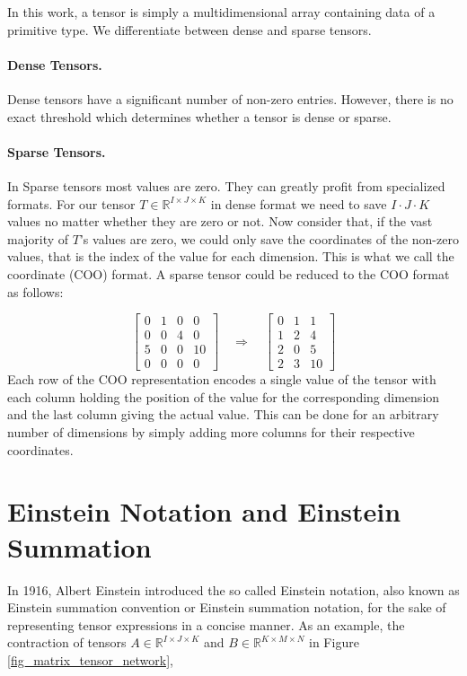 \noindent
In this work, a tensor is simply a multidimensional array containing data of a
primitive type. We differentiate between dense and sparse tensors.

\paragraph{Dense Tensors.}
Dense tensors have a significant number of non-zero entries. However, there is no
exact threshold which determines whether a tensor is dense or sparse.

\paragraph{Sparse Tensors.}
In Sparse tensors most values are zero. They can greatly profit from specialized
formats. For our tensor $T \in \mathbb{R}^{I \times J \times K}$ in dense format
we need to save $I \cdot J \cdot K$ values no matter whether they are zero or not.
Now consider that, if the vast majority of $T$'s values are zero, we could only save
the coordinates of the non-zero values, that is the index of the value for each
dimension. This is what we call the coordinate (COO) format. A sparse tensor could
be reduced to the COO format as follows:

\begin{equation*}
    \begin{bmatrix}
        0 & 1 & 0 & 0  \\
        0 & 0 & 4 & 0  \\
        5 & 0 & 0 & 10 \\
        0 & 0 & 0 & 0
    \end{bmatrix}
    \quad
    \Rightarrow
    \quad
    \begin{bmatrix}
        0 & 1 & 1  \\
        1 & 2 & 4  \\
        2 & 0 & 5  \\
        2 & 3 & 10
    \end{bmatrix}
\end{equation*}
%
Each row of the COO representation encodes a single value of the tensor with each
column holding the position of the value for the corresponding dimension and the last
column giving the actual value. This can be done for an arbitrary number of dimensions
by simply adding more columns for their respective coordinates.

\section{Einstein Notation and Einstein Summation}
In 1916, Albert Einstein introduced the so called Einstein notation, also known as
Einstein summation convention or Einstein summation notation, for the sake of
representing tensor expressions in a concise manner. As an example, the contraction of tensors
$A \in \mathbb{R}^{I \times J \times K}$ and $B \in \mathbb{R}^{K \times M \times N}$
in Figure \ref{fig_matrix_tensor_network},

